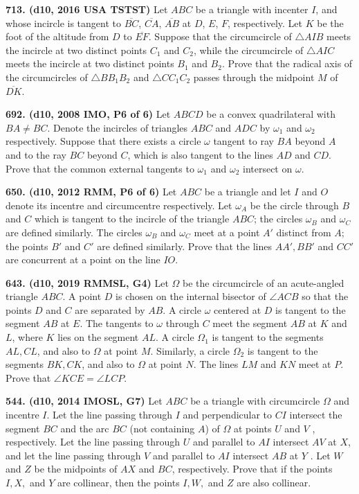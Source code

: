 \documentclass{article}
\begin{document}
\textbf{713. (\color{red}d10\color{black}, 2016 USA TSTST)} Let $ABC$ be a triangle with incenter $I$, and whose incircle is tangent to $\overline{BC}$, $\overline{CA}$, $\overline{AB}$ at $D$, $E$, $F$, respectively. Let $K$ be the foot of the altitude from $D$ to $\overline{EF}$. Suppose that the circumcircle of $\triangle AIB$ meets the incircle at two distinct points $C_1$ and $C_2$, while the circumcircle of $\triangle AIC$ meets the incircle at two distinct points $B_1$ and $B_2$. Prove that the radical axis of the circumcircles of $\triangle BB_1B_2$ and $\triangle CC_1C_2$ passes through the midpoint $M$ of $\overline{DK}$.

\textbf{692. (\color{red}d10\color{black}, 2008 IMO, P6 of 6)} Let $ ABCD$ be a convex quadrilateral with $ BA\neq BC$. Denote the incircles of triangles $ ABC$ and $ ADC$ by $ \omega_{1}$ and $ \omega_{2}$ respectively. Suppose that there exists a circle $ \omega$ tangent to ray $ BA$ beyond $ A$ and to the ray $ BC$ beyond $ C$, which is also tangent to the lines $ AD$ and $ CD$. Prove that the common external tangents to $ \omega_{1}$ and $\omega_{2}$ intersect on $ \omega$.

\textbf{650. (\color{red}d10\color{black}, 2012 RMM, P6 of 6)} Let $ABC$ be a triangle and let $I$ and $O$ denote its incentre and circumcentre respectively. Let $\omega_A$ be the circle through $B$ and $C$ which is tangent to the incircle of the triangle $ABC$; the circles $\omega_B$ and $\omega_C$ are defined similarly. The circles $\omega_B$ and $\omega_C$ meet at a point $A'$ distinct from $A$; the points $B'$ and $C'$ are defined similarly. Prove that the lines $AA',BB'$ and $CC'$ are concurrent at a point on the line $IO$.

\textbf{643. (\color{red}d10\color{black}, 2019 RMMSL, G4)} Let $\Omega$ be the circumcircle of an acute-angled triangle $ABC$. A point $D$ is chosen on the internal bisector of $\angle ACB$ so that the points $D$ and $C$ are separated by $AB$. A circle $\omega$ centered at $D$ is tangent to the segment $AB$ at $E$. The tangents to $\omega$ through $C$ meet the segment $AB$ at $K$ and $L$, where $K$ lies on the segment $AL$. A circle $\Omega_1$ is tangent to the segments $AL, CL$, and also to $\Omega$ at point $M$. Similarly, a circle $\Omega_2$ is tangent to the segments $BK, CK$, and also to $\Omega$ at point $N$. The lines $LM$ and $KN$ meet at $P$. Prove that $\angle KCE = \angle LCP$.

\textbf{544. (\color{red}d10\color{black}, 2014 IMOSL, G7)} Let $ABC$ be a triangle with circumcircle $\Omega$ and incentre $I$. Let the line passing through $I$ and perpendicular to $CI$ intersect the segment $BC$ and the arc $BC$ (not containing $A$) of $\Omega$ at points $U$ and $V$ , respectively. Let the line passing through $U$ and parallel to $AI$ intersect $AV$ at $X$, and let the line passing through $V$ and parallel to $AI$ intersect $AB$ at $Y$ . Let $W$ and $Z$ be the midpoints of $AX$ and $BC$, respectively. Prove that if the points $I, X,$ and $Y$ are collinear, then the points $I, W ,$ and $Z$ are also collinear.
\end{document}
